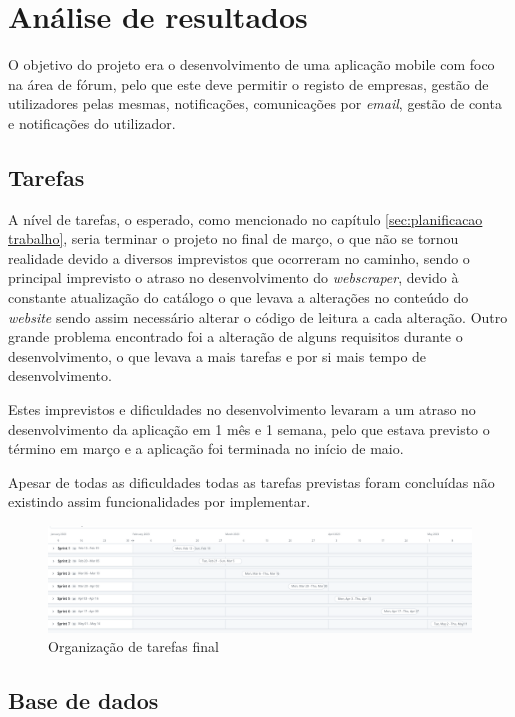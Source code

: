 \chapter{Análise de resultados}
 O objetivo do projeto era o desenvolvimento de uma aplicação mobile com foco na área de fórum, pelo que este deve permitir o registo de empresas, gestão de utilizadores pelas mesmas, notificações, comunicações por \textit{email}, gestão de conta e notificações do utilizador.

 \section{Tarefas}

A nível de tarefas, o esperado, como mencionado no capítulo \ref{sec:planificacao trabalho}, seria terminar o projeto no final de março, o que não se tornou realidade devido a diversos imprevistos que ocorreram no caminho, sendo o principal imprevisto o atraso no desenvolvimento do \textit{webscraper}, devido à constante atualização do catálogo o que levava a alterações no conteúdo do \textit{website} sendo assim necessário alterar o código de leitura a cada alteração. Outro grande problema encontrado foi a alteração de alguns requisitos durante o desenvolvimento, o que levava a mais tarefas e por si mais tempo de desenvolvimento.

Estes imprevistos e dificuldades no desenvolvimento levaram a um atraso no desenvolvimento da aplicação em 1 mês e 1 semana, pelo que estava previsto o término em março e a aplicação foi terminada no início de maio.

Apesar de todas as dificuldades todas as tarefas previstas foram concluídas não existindo assim funcionalidades por implementar.

\begin{figure}[htb]
  \centering
  \includegraphics[width=\textwidth]{images/analise_resultados/planeamento_final.png}
  \caption{Organização de tarefas final}
  \label{fig:78}
\end{figure}

\newpage

\section{Base de dados}

